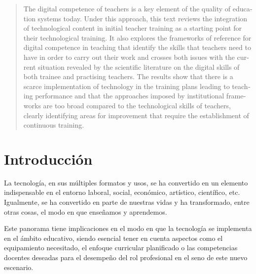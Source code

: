\documentclass[spanish]{textolivre}
\begin{document}
\begin{polyabstract}
\begin{portuguese}
\begin{abstract}
\end{abstract}
\end{portuguese}

\begin{english}
\begin{abstract}
The digital competence of teachers is a key element of the quality of education systems today. Under this approach, this text reviews the integration of technological content in initial teacher training as a starting point for their technological training. It also explores the frameworks of reference for digital competence in teaching that identify the skills that teachers need to have in order to carry out their work and crosses both issues with the current situation revealed by the scientific literature on the digital skills of both trainee and practising teachers. The results show that there is a scarce implementation of technology in the training plans leading to teaching performance and that the approaches imposed by institutional frameworks are too broad compared to the technological skills of teachers, clearly identifying areas for improvement that require the establishment of continuous training.

\end{abstract}
\end{english}

\end{polyabstract}

\section{Introducción}

La tecnología, en sus múltiples formatos y usos, se ha convertido en un elemento indispensable en el entorno laboral, social, económico, artístico, científico, etc. Igualmente, se ha convertido en parte de nuestras vidas y ha transformado, entre otras cosas, el modo en que enseñamos y aprendemos.

Este panorama tiene implicaciones en el modo en que la tecnología se implementa en el ámbito educativo, siendo esencial tener en cuenta aspectos como el equipamiento necesitado, el enfoque curricular planificado o las competencias docentes deseadas para el desempeño del rol profesional en el seno de este nuevo escenario.
\end{document}

